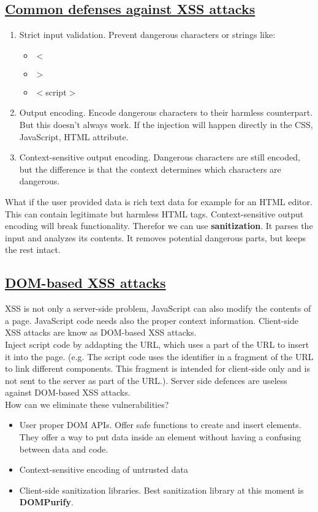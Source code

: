 \documentclass[titlepage]{article}
\begin{document}
    \subsection{\href{https://youtu.be/ua9Y0MAQk8I}{Common defenses against XSS attacks}}
    \begin{enumerate}
        \item Strict input validation. Prevent dangerous characters or strings like:
        \begin{itemize}
            \item $<$
            \item $>$
            \item $<$script$>$
        \end{itemize}
        \item Output encoding. Encode dangerous characters to their harmless counterpart. But this doesn't always work. If the injection will happen directly in the CSS, JavaScript, HTML attribute.
        \item Context-sensitive output encoding. Dangerous characters are still encoded, but the difference is that the context determines which characters are dangerous.
    \end{enumerate}
    What if the user provided data is rich text data for example for an HTML editor. This can contain legitimate but harmless HTML tags. Context-sensitive output encoding will break functionality. Therefor we can use \textbf{sanitization}. It parses the input and analyzes its contents. It removes potential dangerous parts, but keeps the rest intact.
    \subsection{\href{https://youtu.be/gfJ07nZ9ntA}{DOM-based XSS attacks}}
    XSS is not only a server-side problem, JavaScript can also modify the contents of a page. JavaScript code needs also the proper context information. Client-side XSS attacks are know as DOM-based XSS attacks.\\
    Inject script code by addapting the URL, which uses a part of the URL to insert it into the page. (e.g. The script code uses the identifier in a fragment of the URL to link different components. This fragment is intended for client-side only and is not sent to the server as part of the URL.). Server side defences are useless against DOM-based XSS attacks.\\
    How can we eliminate these vulnerabilities?
    \begin{itemize}
        \item User proper DOM APIs. Offer safe functions to create and insert elements. They offer a way to put data inside an element without having a confusing between data and code.
        \item Context-sensitive encoding of untrusted data
        \item Client-side sanitization libraries. Best sanitization library at this moment is \textbf{DOMPurify}.
    \end{itemize}
\end{document}

